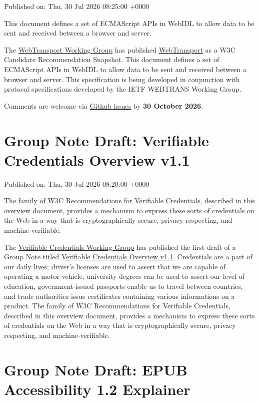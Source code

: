 \documentclass[11pt,a4paper]{article}
\begin{document}
Published on: Thu, 30 Jul 2026 08:25:00 +0000

This document defines a set of ECMAScript APIs in WebIDL to allow data to be sent and received between a browser and server.

The \href{https://www.w3.org/groups/wg/webtransport/}{WebTransport Working Group} has published \href{https://www.w3.org/TR/2026/CR-webtransport-20260730/}{WebTransport} as a W3C Candidate Recommendation Snapshot. This document defines a set of ECMAScript APIs in WebIDL to allow data to be sent and received between a browser and server. This specification is being developed in conjunction with protocol specifications developed by the IETF WEBTRANS Working Group.

Comments are welcome via \href{https://github.com/w3c/webtransport/issues/}{Github issues} by \textbf{30 October 2026}.

\section{Group Note Draft: Verifiable Credentials Overview v1.1}

Published on: Thu, 30 Jul 2026 08:20:00 +0000

The family of W3C Recommendations for Verifiable Credentials, described in this overview document, provides a mechanism to express these sorts of credentials on the Web in a way that is cryptographically secure, privacy respecting, and machine-verifiable.

The \href{https://www.w3.org/groups/wg/vc/}{Verifiable Credentials Working Group} has published the first draft of a Group Note titled \href{https://www.w3.org/TR/2026/DNOTE-vc-overview-1.1-20260730/}{Verifiable Credentials Overview v1.1}. Credentials are a part of our daily lives; driver's licenses are used to assert that we are capable of operating a motor vehicle, university degrees can be used to assert our level of education, government-issued passports enable us to travel between countries, and trade authorities issue certificates containing various informations on a product. The family of W3C Recommendations for Verifiable Credentials, described in this overview document, provides a mechanism to express these sorts of credentials on the Web in a way that is cryptographically secure, privacy respecting, and machine-verifiable.

\section{Group Note Draft: EPUB Accessibility 1.2 Explainer}
\end{document}

